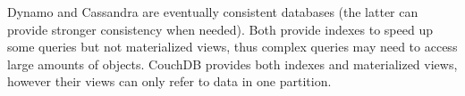 \documentclass{vldb}
\begin{document}
Dynamo \cite{dynamo} and Cassandra \cite{cassandra} are eventually consistent databases (the latter can provide stronger consistency when needed).
Both provide indexes to speed up some queries but not materialized views, thus complex queries may need to access large amounts of objects.
CouchDB \cite{couchDB} provides both indexes and materialized views, however their views can only refer to data in one partition.





%
%
\end{document}
